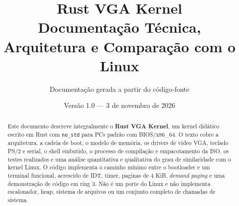 \documentclass[11pt,a4paper,oneside]{report}
\title{\vspace{-2cm}\textbf{Rust VGA Kernel}\\[0.4em]
       \Large Documenta\c{c}\~ao T\'ecnica, Arquitetura e Compara\c{c}\~ao com o Linux}
\author{Documenta\c{c}\~ao gerada a partir do c\'odigo-fonte}
\date{Vers\~ao 1.0 --- 3 de novembro de 2026}
\newcommand{\code}[1]{\texttt{#1}}
\begin{document}

\maketitle

\begin{abstract}
Este documento descreve integralmente o \textbf{Rust VGA Kernel}, um kernel
did\'atico escrito em Rust com \code{no\_std} para PCs padr\~ao com BIOS/x86\_64.
O texto cobre a arquitetura, a cadeia de boot, o modelo de mem\'oria, os
drivers de v\'ideo VGA, teclado PS/2 e serial, o shell embutido, o processo de
compila\c{c}\~ao e empacotamento da ISO, os testes realizados e uma an\'alise
quantitativa e qualitativa do grau de similaridade com o kernel Linux.
O c\'odigo implementa o caminho m\'inimo entre o bootloader e um terminal
funcional, acrescido de IDT, timer, paginas de 4 KiB, \emph{demand paging} e
uma demonstra\c{c}\~ao de c\'odigo em ring 3. N\~ao \'e um porte do Linux e
n\~ao implementa escalonador, heap, sistema de arquivos ou um conjunto
completo de chamadas de sistema.
\end{abstract}

\tableofcontents
\listoffigures
\listoftables

\clearpage
















\end{document}
